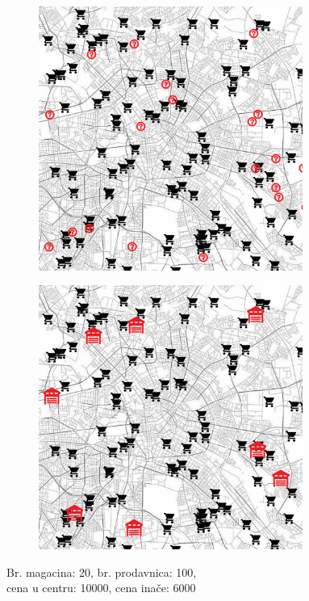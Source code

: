 \documentclass[a4paper]{article}
\begin{document}
\begin{figure}[H]
\centering
\begin{subfigure}{.5\textwidth}
    \centering
    \includegraphics[width=0.95\textwidth]{pics/candidates3.png}
\end{subfigure}%
\begin{subfigure}{.5\textwidth}
    \centering
    \includegraphics[width=0.95\textwidth]{pics/final3.png}
\end{subfigure}
\caption[long]{Br. magacina: 20, br. prodavnica: 100,\\ cena u centru: 10000, cena inače: 6000}
\label{fig:sl3}
\end{figure}
\end{document}
